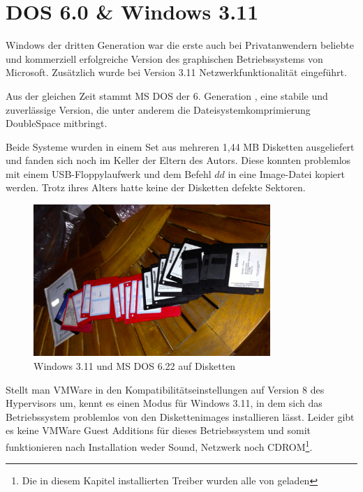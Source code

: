 \newpage

\section{DOS 6.0 \& Windows 3.11}
	Windows der dritten Generation war die erste auch bei Privatanwendern beliebte und kommerziell erfolgreiche Version des graphischen Betriebssystems von Microsoft.
	Zusätzlich wurde bei Version 3.11 Netzwerkfunktionalität eingeführt.

	Aus der gleichen Zeit stammt MS DOS der 6. Generation \cite{WinHistory}, eine stabile und zuverlässige Version, die unter anderem die Dateisystemkomprimierung DoubleSpace mitbringt.

	Beide Systeme wurden in einem Set aus mehreren 1,44 MB Disketten ausgeliefert und fanden sich noch im Keller der Eltern des Autors.
	Diese konnten problemlos mit einem USB-Floppylaufwerk und dem Befehl $dd$ in eine Image-Datei kopiert werden.
	Trotz ihres Alters hatte keine der Disketten defekte Sektoren.

		\begin{figure}[h]
		\begin{center}
			\includegraphics[width=0.8\textwidth]{img/win311disks.jpg}
			\caption{Windows 3.11 und MS DOS 6.22 auf Disketten}
			\label{fig:screenshot-win311disks}
		\end{center}
	\end{figure}

	Stellt man VMWare in den Kompatibilitätseinstellungen auf Version 8 des Hypervisors um, kennt es einen Modus für Windows 3.11, in dem sich das Betriebssystem problemlos von den Diskettenimages installieren lässt. Leider gibt es keine VMWare Guest Additions für dieses Betriebssystem und somit funktionieren nach Installation weder Sound, Netzwerk noch CDROM\footnote{Die in diesem Kapitel installierten Treiber wurden alle von \cite{VMDriver} geladen}.

